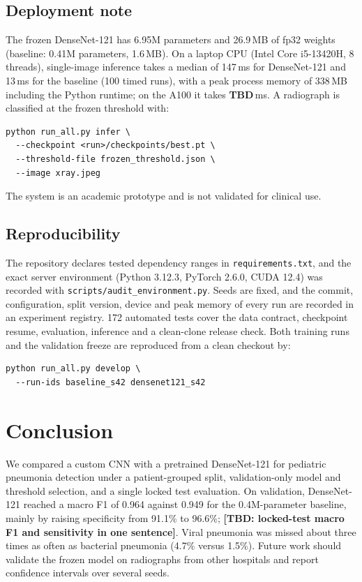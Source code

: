 \documentclass[conference]{IEEEtran}
\newcommand{\TBD}[1]{{\color{red}\textbf{[TBD: #1]}}}
\newcommand{\tbd}{{\color{red}\textbf{TBD}}}
\begin{document}
\subsection{Deployment note}
The frozen DenseNet-121 has 6.95M parameters and 26.9\,MB of fp32 weights (baseline: 0.41M parameters, 1.6\,MB). On a laptop CPU (Intel Core i5-13420H, 8 threads), single-image inference takes a median of 147\,ms for DenseNet-121 and 13\,ms for the baseline (100 timed runs), with a peak process memory of 338\,MB including the Python runtime; on the A100 it takes \tbd{}\,ms. A radiograph is classified at the frozen threshold with:
\begin{footnotesize}
\begin{verbatim}
python run_all.py infer \
  --checkpoint <run>/checkpoints/best.pt \
  --threshold-file frozen_threshold.json \
  --image xray.jpeg
\end{verbatim}
\end{footnotesize}
The system is an academic prototype and is not validated for clinical use.

\subsection{Reproducibility}
The repository declares tested dependency ranges in \texttt{requirements.txt}, and the exact server environment (Python 3.12.3, PyTorch 2.6.0, CUDA 12.4) was recorded with \texttt{scripts/audit\_environment.py}. Seeds are fixed, and the commit, configuration, split version, device and peak memory of every run are recorded in an experiment registry. 172 automated tests cover the data contract, checkpoint resume, evaluation, inference and a clean-clone release check. Both training runs and the validation freeze are reproduced from a clean checkout by:
\begin{footnotesize}
\begin{verbatim}
python run_all.py develop \
  --run-ids baseline_s42 densenet121_s42
\end{verbatim}
\end{footnotesize}

\section{Conclusion}
\label{sec:conclusion}
We compared a custom CNN with a pretrained DenseNet-121 for pediatric pneumonia detection under a patient-grouped split, validation-only model and threshold selection, and a single locked test evaluation. On validation, DenseNet-121 reached a macro F1 of 0.964 against 0.949 for the 0.4M-parameter baseline, mainly by raising specificity from 91.1\% to 96.6\%; \TBD{locked-test macro F1 and sensitivity in one sentence}. Viral pneumonia was missed about three times as often as bacterial pneumonia (4.7\% versus 1.5\%). Future work should validate the frozen model on radiographs from other hospitals and report confidence intervals over several seeds.
\end{document}
